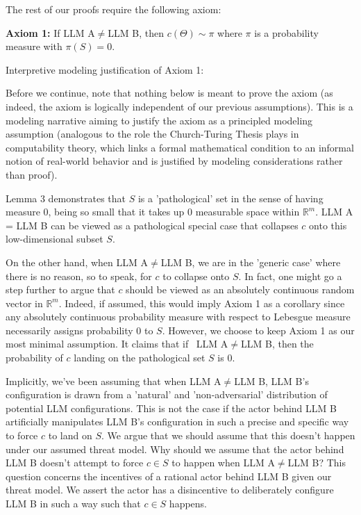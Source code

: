 \documentclass{article}
\begin{document}
The rest of our proofs require the following axiom:



\textbf{Axiom 1:} If LLM A$\displaystyle \neq $LLM B, then $\displaystyle c\left( \Theta \right) \sim \pi $ where $\displaystyle \pi $ is a probability measure with $\displaystyle \pi \left( S\right) =0$.



Interpretive modeling justification of Axiom 1:

Before we continue, note that nothing below is meant to prove the axiom (as indeed, the axiom is logically independent of our previous assumptions). This is a modeling narrative aiming to justify the axiom as a principled modeling assumption (analogous to the role the Church-Turing Thesis plays in computability theory, which links a formal mathematical condition to an informal notion of real-world behavior and is justified by modeling considerations rather than proof).



Lemma 3 demonstrates that $\displaystyle S$ is a 'pathological' set in the sense of having measure 0, being so small that it takes up 0 measurable space within $\displaystyle \mathbb{R}^{m}$. LLM A = LLM B can be viewed as a pathological special case that collapses $\displaystyle c$ onto this low-dimensional subset $\displaystyle S$.



On the other hand, when LLM A$\displaystyle \neq $LLM B, we are in the 'generic case' where there is no reason, so to speak, for $\displaystyle c$ to collapse onto $\displaystyle S$. In fact, one might go a step further to argue that $\displaystyle c$ should be viewed as an absolutely continuous random vector in $\displaystyle \mathbb{R}^{m}$. Indeed, if assumed, this would imply Axiom 1 as a corollary since any absolutely continuous probability measure with respect to Lebesgue measure necessarily assigns probability 0 to $\displaystyle S$. However, we choose to keep Axiom 1 as our most minimal assumption. It claims that if \ LLM A$\displaystyle \neq $LLM B, then the probability of $\displaystyle c$ landing on the pathological set $\displaystyle S$ is 0.



Implicitly, we've been assuming that when LLM A$\displaystyle \neq $LLM B, LLM B's configuration is drawn from a 'natural' and 'non-adversarial' distribution of potential LLM configurations. This is not the case if the actor behind LLM B artificially manipulates LLM B's configuration in such a precise and specific way to force $\displaystyle c$ to land on $\displaystyle S$. We argue that we should assume that this doesn't happen under our assumed threat model. Why should we assume that the actor behind LLM B doesn't attempt to force $\displaystyle c\in S$ to happen when LLM A$\displaystyle \neq $LLM B? This question concerns the incentives of a rational actor behind LLM B given our threat model. We assert the actor has a disincentive to deliberately configure LLM B in such a way such that $\displaystyle c\in S$ happens.
\end{document}
